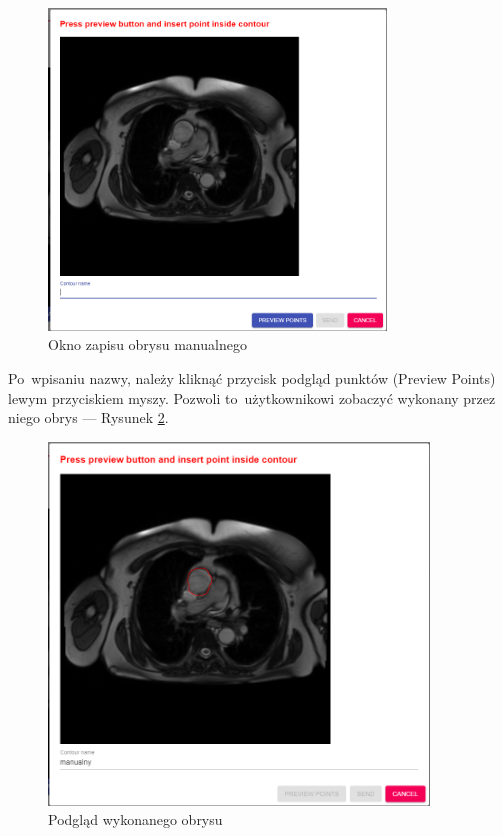 \documentclass[a4paper,11pt,twoside,openright]{report}
\theoremstyle{definition}
\begin{document}
\begin{enumerate}
\begin{figure}[h!]
	\center
	\includegraphics[width=0.8\textwidth]{6}
	\caption{Okno zapisu obrysu manualnego}
    	\label{fig:6}
\end{figure}

 Po~wpisaniu nazwy, należy kliknąć przycisk podgląd punktów (Preview Points)
 lewym przyciskiem myszy. Pozwoli to~użytkownikowi zobaczyć wykonany przez niego
 obrys --- Rysunek \ref{fig:7}.

 \pagebreak

\begin{figure}[h!]
	\center
	\includegraphics[width=0.9\textwidth]{7}
	\caption{Podgląd wykonanego obrysu}
    	\label{fig:7}
\end{figure}


\end{enumerate}
\end{document}
